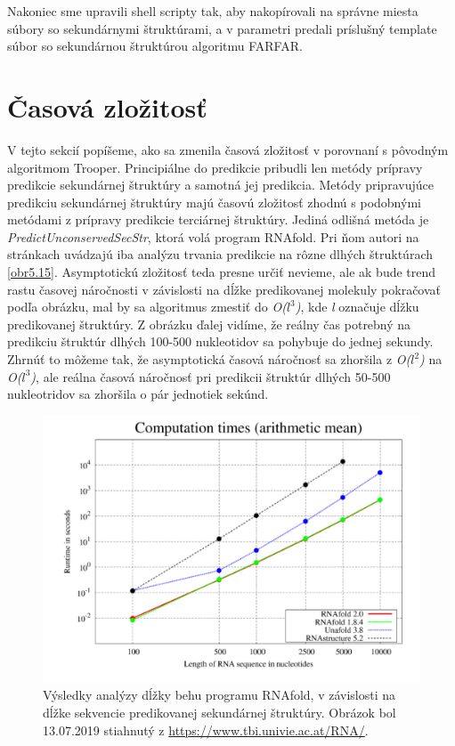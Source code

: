 \indent Nakoniec sme upravili shell scripty tak, aby nakopírovali na správne miesta súbory so sekundárnymi štruktúrami, a v parametri predali príslušný template súbor so sekundárnou štruktúrou algoritmu FARFAR.


\section{Časová zložitosť}
V tejto sekcií popíšeme, ako sa zmenila časová zložitosť v porovnaní s pôvodným algoritmom Trooper.
Principiálne do predikcie pribudli len metódy prípravy predikcie sekundárnej štruktúry a samotná jej predikcia. Metódy pripravujúce predikciu sekundárnej štruktúry majú časovú zložitosť zhodnú s podobnými metódami z prípravy predikcie terciárnej štruktúry. Jediná odlišná metóda je \textit{PredictUnconservedSecStr}, ktorá volá program RNAfold. Pri ňom autori na stránkach uvádzajú iba analýzu trvania predikcie na rôzne dlhých štruktúrach \autoref{obr5.15}. Asymptotickú zložitosť teda presne určiť nevieme, ale ak bude trend rastu časovej náročnosti v závislosti na dĺžke predikovanej molekuly pokračovať podľa obrázku, mal by sa algoritmus zmestiť do \textit{O($l^3$)}, kde \textit{l} označuje dĺžku predikovanej štruktúry. Z obrázku ďalej vidíme, že reálny čas potrebný na predikciu štruktúr dlhých 100-500 nukleotidov sa pohybuje do jednej sekundy. Zhrnúť to môžeme tak, že asymptotická časová náročnosť sa zhoršila z  \textit{O($l^2$)} na \textit{O($l^3$)}, ale reálna časová náročnosť pri predikcii štruktúr dlhých 50-500 nukleotridov sa zhoršila o pár jednotiek sekúnd.

\begin{figure}%
\includegraphics[width=\textwidth]{../img/rnafold}
\caption{Výsledky analýzy dĺžky behu programu RNAfold, v závislosti na dĺžke sekvencie predikovanej sekundárnej štruktúry. Obrázok bol 13.07.2019 stiahnutý z \url{https://www.tbi.univie.ac.at/RNA/}.}
\label{obr5.15}
\end{figure}


